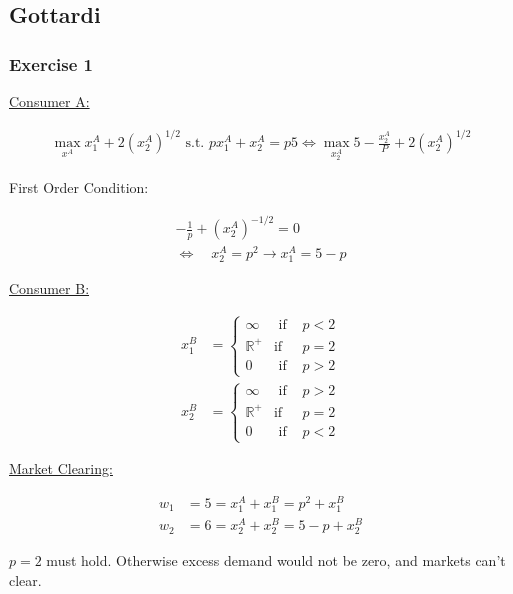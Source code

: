 \newpage
{
\subsection*{Gottardi}

\subsubsection*{Exercise 1}

\begin{enumerate}[label=(\alph*)]
{\item 
\underline{Consumer A:}

\begin{align*}
    \max _{x^A} x_1^A+2\left(x_2^A\right)^{1 / 2} \text { s.t. } p x_1^A+x_2^A=p 5
    \Longleftrightarrow \max _{x_2^A} 5-\frac{x_2^A}{P}+2\left(x_2^A\right)^{1 / 2}
\end{align*}

First Order Condition:

\begin{align*}
    -\frac{1}{p}+\left(x_2^A\right)^{-1 / 2}=0 \\
    \Leftrightarrow \quad x_2^A=p^2 \rightarrow x_1^A=5-p
\end{align*}

\underline{Consumer B:} 

\begin{align*}
    x_1^B &= \left\{\begin{array}{lll}
    \infty & \text { if } & p<2 \\
    \mathbb{R}^{+} & \text {if } & p=2 \\
    0 & \text { if } & p>2
    \end{array}\right. \\
    x_2^B &= \left\{\begin{array}{lll}
    \infty & \text { if } & p>2 \\
    \mathbb{R}^{+} & \text {if } & p=2 \\
    0 & \text { if } & p<2
    \end{array}\right.
\end{align*}

\underline{Market Clearing:}   

\begin{align*}
    w_1 &= 5=x_1^A+x_1^B=p^2+x_1^B \\
    w_2 &= 6=x_2^A+x_2^B=5-p+x_2^B
\end{align*}

$p=2$ must hold. Otherwise excess demand would not be zero, and markets can't clear.

}
\end{enumerate}}

